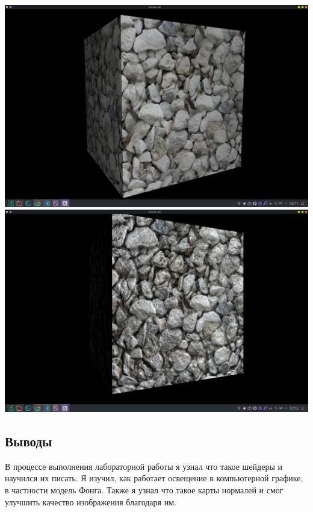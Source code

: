 \documentclass[12pt]{article}
\begin{document}
\includegraphics[width=15cm]{demo1.png} \\
\includegraphics[width=15cm]{demo2.png}

\subsection*{Выводы}

В процессе выполнения лабораторной работы я узнал что такое шейдеры и научился их писать.
Я изучил, как работает освещение в компьютерной графике, в частности модель Фонга.
Также я узнал что такое карты нормалей и смог улучшить качество изображения благодаря им.
\end{document}
